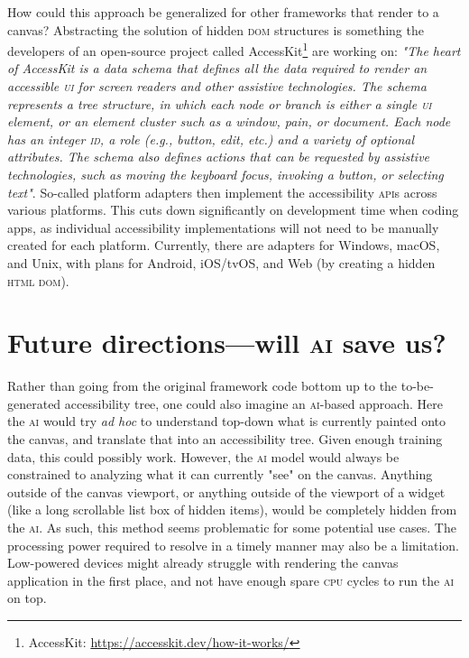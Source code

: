 \documentclass[sigconf]{acmart}
\begin{document}
How could this approach be generalized for other frameworks that render to a canvas? Abstracting the solution of hidden \textsc{dom} structures is something the developers of an open-source project called AccessKit\footnote{AccessKit: \url{https://accesskit.dev/how-it-works/}} are working on: \textit{"The heart of AccessKit is a data schema that defines all the data required to render an accessible \textsc{ui} for screen readers and other assistive technologies. The schema represents a tree structure, in which each node or branch is either a single \textsc{ui} element, or an element cluster such as a window, pain, or document. Each node has an integer \textsc{id}, a role (\textit{e.g.}, button, edit, etc.) and a variety of optional attributes. The schema also defines actions that can be requested by assistive technologies, such as moving the keyboard focus, invoking a button, or selecting text"}. So-called platform adapters then implement the accessibility \textsc{api}s across various platforms. This cuts down significantly on development time when coding apps, as individual accessibility implementations will not need to be manually created for each platform. Currently, there are adapters for Windows, mac\textsc{OS}, and Unix, with plans for Android, i\textsc{OS}/tv\textsc{OS}, and Web (by creating a hidden \textsc{html dom}).

\section{Future directions---will \textsc{ai} save us?}

Rather than going from the original framework code bottom up to the to-be-generated accessibility tree, one could also imagine an \textsc{ai}-based approach. Here the \textsc{ai} would try \textit{ad hoc} to understand top-down what is currently painted onto the canvas, and translate that into an accessibility tree. Given enough training data, this could possibly work. However, the \textsc{ai} model would always be constrained to analyzing what it can currently "see" on the canvas. Anything outside of the canvas viewport, or anything outside of the viewport of a widget (like a long scrollable list box of hidden items), would be completely hidden from the \textsc{ai}. As such, this method seems problematic for some potential use cases. The processing power required to resolve in a timely manner may also be a limitation. Low-powered devices might already struggle with rendering the canvas application in the first place, and not have enough spare \textsc{cpu} cycles to run the \textsc{ai} on top.
\end{document}
